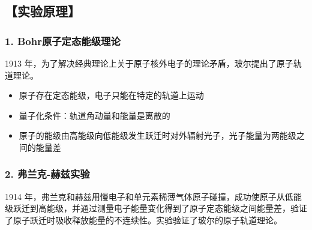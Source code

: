 \documentclass[12pt,a4paper,UTF8]{ctexart}
\begin{document}
\subsection*{【实验原理】}
    \subsubsection*{1. Bohr原子定态能级理论}
		1913 年，为了解决经典理论上关于原子核外电子的理论矛盾，玻尔提出了原子轨道理论。
		\begin{itemize}
			\item 原子存在定态能级，电子只能在特定的轨道上运动
			\item 量子化条件：轨道角动量和能量是离散的
			\item 原子的能级由高能级向低能级发生跃迁时对外辐射光子，光子能量为两能级之间的能量差
		\end{itemize}
    \subsubsection*{2. 弗兰克-赫兹实验}
		1914 年，弗兰克和赫兹用慢电子和单元素稀薄气体原子碰撞，成功使原子从低能级跃迁到高能级，并通过测量电子能量变化得到了原子定态能级之间能量差，验证了原子跃迁时吸收释放能量的不连续性。实验验证了玻尔的原子轨道理论。
\end{document}
